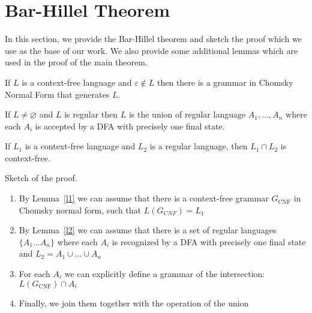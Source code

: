 \section{Bar-Hillel Theorem}
\label{sec:b-h-th}

In this section, we provide the Bar-Hillel theorem and sketch the proof which we use as the base of our work.
We also provide some additional lemmas which are used in the proof of the main theorem.

\begin{lemma} \label{l1}
	If $L$ is a context-free language and $\varepsilon \notin L$ then there is a grammar in Chomsky Normal Form that generates $L$.
\end{lemma}

\begin{lemma} \label{l2}
	If $ L \neq \varnothing $ and $L$ is regular then $L$ is the union of regular language $A_1, \ldots , A_n$ where each $A_i$ is accepted by a DFA with precisely one final state.
\end{lemma}

\begin{theorem}
	If $L_1$ is a context-free language and $L_2$ is a regular language, then $L_1 \cap L_2$ is context-free.
\end{theorem}


Sketch of the proof.
\begin{enumerate}
	\item By Lemma~\ref{l1} we can assume that there is a context-free grammar $G_{\text{CNF}}$ in Chomsky normal form, such that $L(G_{CNF}) = L_1$
	\item By Lemma~\ref{l2} we can assume that there is a set of regular languages $\{A_{1} \ldots A_n \}$ where each $A_i$ is recognized by a DFA with precisely one final state and $L_2 = A_1 \cup \ldots \cup A_n$
	\item For each $A_i$ we can explicitly define a grammar of the intersection: $L( G_{\text{CNF}} ) \cap A_i$
	\item Finally, we join them together with the operation of the union
\end{enumerate}

